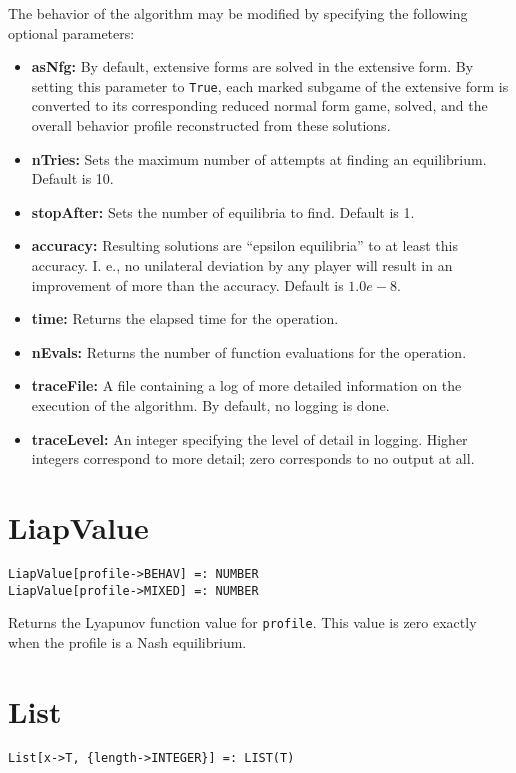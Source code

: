 The behavior of the algorithm may be modified by specifying the following
optional parameters:
\begin{itemize}
\item
\textbf{asNfg:} By default, extensive forms are solved in the extensive form.
By setting this parameter to \verb+True+, each marked subgame of the
extensive form is converted to its corresponding reduced normal form game,
solved, and the overall behavior profile reconstructed from these
solutions.
\item
\textbf{nTries:} Sets the maximum number of attempts at finding an
equilibrium. Default is 10.
\item
\textbf{stopAfter:} Sets the number of equilibria to find.  Default is 1.
\item
\textbf{accuracy:} Resulting solutions are ``epsilon equilibria'' to at least
this accuracy.  I. e., no unilateral deviation by any player will
result in an improvement of more than the accuracy.  Default is
$1.0e-8$.
\item
\textbf{time:} Returns the elapsed time for the operation.
\item
\textbf{nEvals:} Returns the number of function evaluations for the operation.
\item
\textbf{traceFile:} A file containing a log of more detailed information on the
execution of the algorithm.  By default, no logging is done.
\item
\textbf{traceLevel:} An integer specifying the level of detail in logging.
Higher integers correspond to more detail; zero corresponds to no output
at all.
\end{itemize}


\section*{LiapValue}\label{PrimLiapValue}
\begin{verbatim}
LiapValue[profile->BEHAV] =: NUMBER 
LiapValue[profile->MIXED] =: NUMBER 
\end{verbatim} 

\noindent
Returns the Lyapunov function value for \verb+profile+.  This value is
zero exactly when the profile is a Nash equilibrium. 


\section*{List}\label{PrimList}
\begin{verbatim}
List[x->T, {length->INTEGER}] =: LIST(T)
\end{verbatim}
\foralltypes


